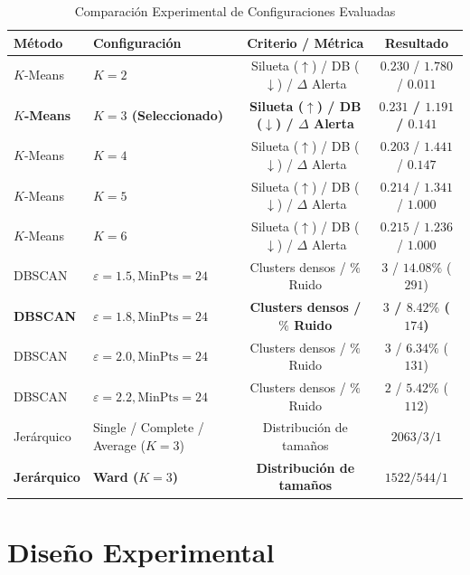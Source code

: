 \documentclass[conference]{IEEEtran}
\begin{document}
\begin{table}[!t]
\centering
\caption{Comparaci\'on Experimental de Configuraciones Evaluadas}
\label{tab:experimentos}
\scriptsize
\begin{tabular}{@{}llcc@{}}
\toprule
\textbf{M\'etodo} & \textbf{Configuraci\'on} & \textbf{Criterio / M\'etrica} & \textbf{Resultado} \\
\midrule
$K$-Means & $K = 2$ & Silueta ($\uparrow$) / DB ($\downarrow$) / $\Delta$ Alerta & $0.230$ / $1.780$ / $0.011$ \\
\textbf{$K$-Means} & \textbf{$K = 3$ (Seleccionado)} & \textbf{Silueta ($\uparrow$) / DB ($\downarrow$) / $\Delta$ Alerta} & \textbf{$0.231$ / $1.191$ / $0.141$} \\
$K$-Means & $K = 4$ & Silueta ($\uparrow$) / DB ($\downarrow$) / $\Delta$ Alerta & $0.203$ / $1.441$ / $0.147$ \\
$K$-Means & $K = 5$ & Silueta ($\uparrow$) / DB ($\downarrow$) / $\Delta$ Alerta & $0.214$ / $1.341$ / $1.000$ \\
$K$-Means & $K = 6$ & Silueta ($\uparrow$) / DB ($\downarrow$) / $\Delta$ Alerta & $0.215$ / $1.236$ / $1.000$ \\
\midrule
DBSCAN & $\varepsilon = 1.5, \text{MinPts} = 24$ & Clusters densos / $\%$ Ruido & $3$ / $14.08\%$ ($291$) \\
\textbf{DBSCAN} & \textbf{$\varepsilon = 1.8, \text{MinPts} = 24$} & \textbf{Clusters densos / $\%$ Ruido} & \textbf{$3$ / $8.42\%$ ($174$)} \\
DBSCAN & $\varepsilon = 2.0, \text{MinPts} = 24$ & Clusters densos / $\%$ Ruido & $3$ / $6.34\%$ ($131$) \\
DBSCAN & $\varepsilon = 2.2, \text{MinPts} = 24$ & Clusters densos / $\%$ Ruido & $2$ / $5.42\%$ ($112$) \\
\midrule
Jer\'arquico & Single / Complete / Average ($K=3$) & Distribuci\'on de tama\~nos & $2063 / 3 / 1$ \\
\textbf{Jer\'arquico} & \textbf{Ward ($K = 3$)} & \textbf{Distribuci\'on de tama\~nos} & \textbf{$1522 / 544 / 1$} \\
\bottomrule
\end{tabular}
\end{table}

\section{Dise\~no Experimental}
\end{document}
